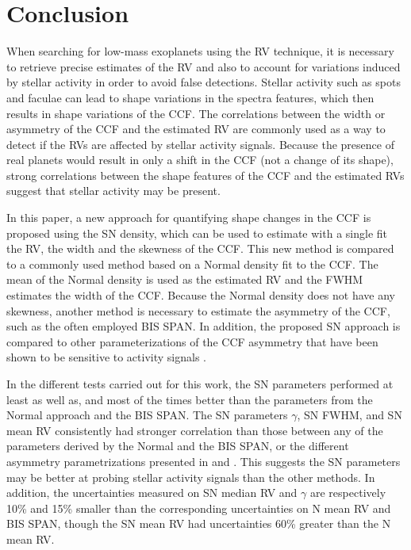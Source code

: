 \documentclass{aa}
\begin{document}
\section{Conclusion} \label{sec:conclu}

When searching for low-mass exoplanets using the RV technique, it is necessary to retrieve precise estimates of the RV and also to account for variations induced by stellar activity in order to avoid false detections.  
Stellar activity such as spots and faculae can lead to shape variations in the spectra features, which then results in shape variations of the CCF.
The correlations between the width or asymmetry of the CCF and the estimated RV are commonly used as a way to detect if the RVs are affected by stellar activity signals.   
Because the presence of real planets would result in only a shift in the CCF (not a change of its shape), strong correlations between the shape features of the CCF and the estimated RVs suggest that stellar activity may be present.



In this paper, a new approach for quantifying shape changes in the CCF is proposed using the SN density, which can be used to estimate with a single fit the RV, the width and the skewness of the CCF. 
This new method is compared to a commonly used method based on a Normal density fit to the CCF.  The mean of the Normal density is used as the estimated RV and the FWHM estimates the width of the CCF.  Because the Normal density does not have any skewness, another method is necessary to estimate the asymmetry of the CCF, such as the often employed BIS SPAN.
In addition, the proposed SN approach is compared to other parameterizations of the CCF asymmetry that have been shown to be sensitive to activity signals \citep[][]{Boisse-2011,Figueira-2013}.

In the different tests carried out for this work, the SN parameters performed at least as well as, and most of the times better than the parameters from the Normal approach and the BIS SPAN.
The SN parameters $\gamma$, SN FWHM, and SN mean RV consistently had stronger correlation than those between any of the parameters derived by the Normal and the BIS SPAN, or the different asymmetry parametrizations presented in \citet{Boisse-2011} and \citet{Figueira-2013}. 
This suggests the SN parameters may be better at probing stellar activity signals than the other methods. 
In addition, the uncertainties measured on SN median RV and $\gamma$ are respectively 10\% and 15\% smaller than the corresponding uncertainties on N mean RV and BIS SPAN, though the SN mean RV had uncertainties 60\% greater than the N mean RV.
\end{document}
